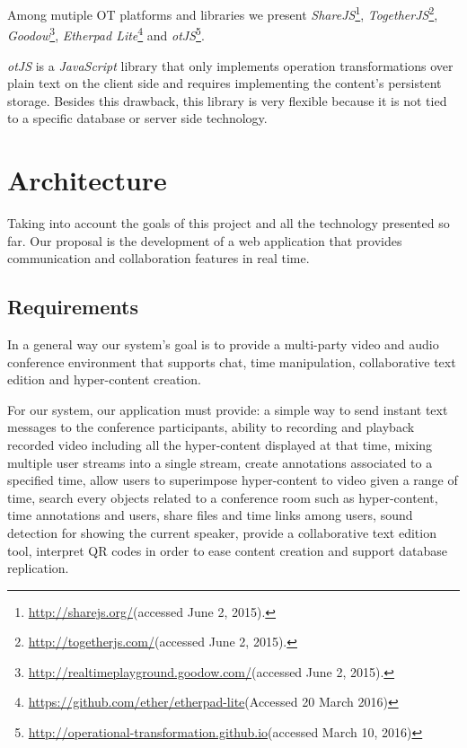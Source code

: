 \documentclass[conference,compsoc,a4paper]{IEEEtran}
\begin{document}
	Among mutiple \gls{OT} platforms and libraries we present \emph{ShareJS}\footnote{\url{http://sharejs.org/}(accessed June 2, 2015).}, \emph{TogetherJS}\footnote{\url{http://togetherjs.com/}(accessed June 2, 2015).}, \emph{Goodow}\footnote{\url{http://realtimeplayground.goodow.com/}(accessed June 2, 2015).}, \emph{Etherpad Lite}\footnote{\url{https://github.com/ether/etherpad-lite}(Accessed 20 March 2016)} and \emph{otJS}\footnote{\url{http://operational-transformation.github.io}(accessed March 10, 2016)}.


	\emph{otJS} is a \emph{JavaScript} library that only implements operation transformations over plain text on the client side and requires implementing the content's persistent storage. Besides this drawback, this library is very flexible because it is not tied to a specific database or server side technology.
        


\section{Architecture}
\label{chapter:architecture}

Taking into account the goals of this project and all the technology presented so far. Our proposal is the development of a web application that provides communication and collaboration features in real time.

\subsection{Requirements}
In a general way our system's goal is to provide a multi-party video and audio conference environment that supports chat, time manipulation, collaborative text edition and hyper-content creation.


For our system, our application must provide: a simple way to send instant text messages to the conference participants, ability to recording and playback recorded video including all the hyper-content displayed at that time, mixing multiple user streams into a single stream, create annotations associated to a specified time, allow users to superimpose hyper-content to video given a range of time, search every objects related to a conference room such as hyper-content, time annotations and users, share files and time links among users, sound detection for showing the current speaker, provide a collaborative text edition tool, interpret \gls{QR} codes in order to ease content creation and support database replication.
\end{document}
